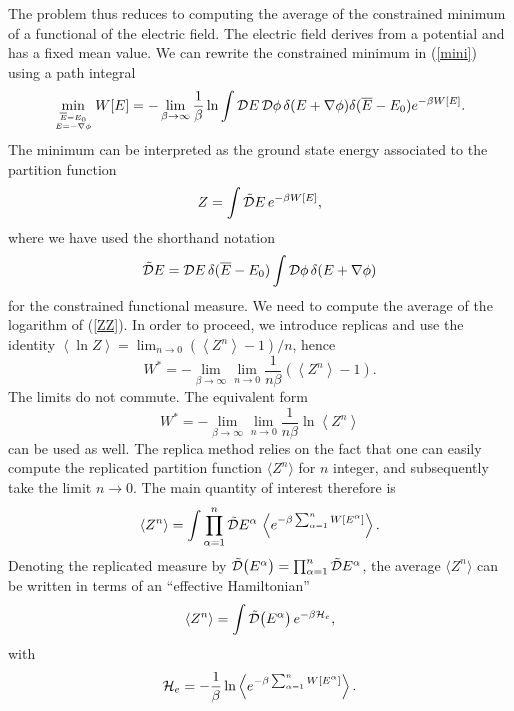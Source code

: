 The problem thus reduces to computing the average of
the constrained minimum of a functional of the electric field. The
electric field derives from a potential and has a fixed mean value. We
can rewrite the constrained minimum in (\ref{mini}) using a path
integral
\begin{equation}
\mathop{\text{min}}_{\overline{E}=E_0\atop{E=-\nabla\phi}}
W[E]=-\lim_{\beta\rightarrow\infty}
\frac{1}{\beta}\mathop{\text{ln}}
\int{\cal{D}}E\,{\cal{D}}\phi\,
\delta(E+\nabla\phi)
\delta(\overline{E}-E_0)
e^{-\beta W[E]}.
\end{equation}
The minimum can be interpreted as the ground state energy
associated to the partition function
\begin{equation}
\label{ZZ}
Z=\int \tilde{\cal{D}}E\,
e^{-\beta W[E]},
\end{equation}
where we have used the shorthand notation
\begin{equation}
\tilde{\cal{D}}E={\cal{D}}E\,\delta(\overline{E}-E_0)\int{\cal{D}}\phi\,
\delta(E+\nabla\phi)
\end{equation}
for the constrained functional measure.
We need to compute the average of the logarithm of (\ref{ZZ}). In order
to proceed, we introduce replicas \cite{EDWA75,MEZA87} and use the identity
$\left\langle\ln Z\right\rangle=
\lim_{n\rightarrow 0}(\left\langle Z^n\right\rangle-1)/n$, hence
\begin{equation}
\label{wstar0}
W^*=-\lim_{\beta\rightarrow\infty}
\lim_{n\rightarrow 0}
\frac{1}{n\beta}
(\left\langle Z^n\right\rangle-1).
\end{equation}
The limits do not commute. The equivalent form
\begin{equation}
\label{wstar}
W^*=-\lim_{\beta\rightarrow\infty}\lim_{n\rightarrow 0}\frac{1}{n\beta}\ln\left\langle Z^n\right\rangle
\end{equation}
can be used as well. The replica method
relies on the fact that one can easily compute
the replicated partition function
$\langle Z^n\rangle$ for $n$ integer, and subsequently take the limit
$n\rightarrow 0$. The main quantity of interest therefore is
\begin{equation}
\left\langle Z^n\right\rangle=
\int\prod_{\alpha=1}^{n}
\tilde{\cal{D}}E^{\alpha}\,\left\langle
e^{-\beta \sum_{\alpha=1}^{n} W[E^{\alpha}]}
\right\rangle.
\end{equation}
Denoting the replicated measure by
$\tilde{\cal{D}}\bigl(E^\alpha\bigr)=\prod_{\alpha=1}^{n}
\tilde{\cal{D}}E^{\alpha}$, the average $\langle Z^n\rangle$ can be written
in terms of an ``effective Hamiltonian''
\begin{equation}
\label{zneff}
\langle Z^n\rangle=
\int\tilde{\cal{D}}\bigl(E^\alpha\bigr)\, e^{-\beta{\cal{H}}_e},
\end{equation}
with
\begin{equation}
\label{heff}
{\cal{H}}_e=-{1\over\beta}\ln\left\langle e^{-\beta\sum_{\alpha=1}^{n} W[E^{\alpha}]}
\right\rangle.
\end{equation}

